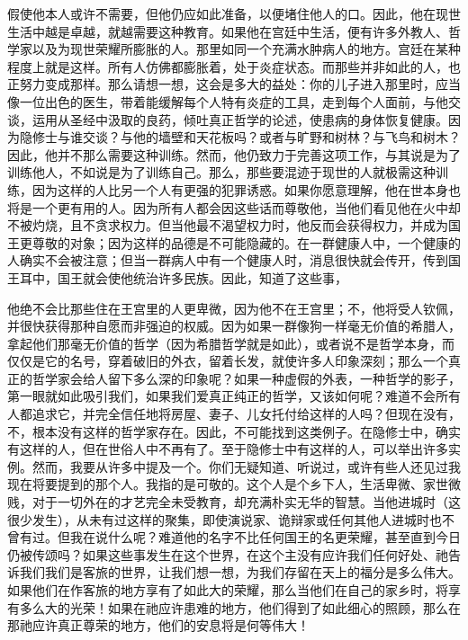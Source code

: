 假使他本人或许不需要，但他仍应如此准备，以便堵住他人的口。因此，他在现世生活中越是卓越，就越需要这种教育。如果他在宫廷中生活，便有许多外教人、哲学家以及为现世荣耀所膨胀的人。那里如同一个充满水肿病人的地方。宫廷在某种程度上就是这样。所有人仿佛都膨胀着，处于炎症状态。而那些并非如此的人，也正努力变成那样。那么请想一想，这会是多大的益处：你的儿子进入那里时，应当像一位出色的医生，带着能缓解每个人特有炎症的工具，走到每个人面前，与他交谈，运用从圣经中汲取的良药，倾吐真正哲学的论述，使患病的身体恢复健康。因为隐修士与谁交谈？与他的墙壁和天花板吗？或者与旷野和树林？与飞鸟和树木？因此，他并不那么需要这种训练。然而，他仍致力于完善这项工作，与其说是为了训练他人，不如说是为了训练自己。那么，那些要混迹于现世的人就极需这种训练，因为这样的人比另一个人有更强的犯罪诱惑。如果你愿意理解，他在世本身也将是一个更有用的人。因为所有人都会因这些话而尊敬他，当他们看见他在火中却不被灼烧，且不贪求权力。但当他最不渴望权力时，他反而会获得权力，并成为国王更尊敬的对象；因为这样的品德是不可能隐藏的。在一群健康人中，一个健康的人确实不会被注意；但当一群病人中有一个健康人时，消息很快就会传开，传到国王耳中，国王就会使他统治许多民族。因此，知道了这些事，\par

他绝不会比那些住在王宫里的人更卑微，因为他不在王宫里；不，他将受人钦佩，并很快获得那种自愿而非强迫的权威。因为如果一群像狗一样毫无价值的希腊人，拿起他们那毫无价值的哲学（因为希腊哲学就是如此），或者说不是哲学本身，而仅仅是它的名号，穿着破旧的外衣，留着长发，就使许多人印象深刻；那么一个真正的哲学家会给人留下多么深的印象呢？如果一种虚假的外表，一种哲学的影子，第一眼就如此吸引我们，如果我们爱真正纯正的哲学，又该如何呢？难道不会所有人都追求它，并完全信任地将房屋、妻子、儿女托付给这样的人吗？但现在没有，不，根本没有这样的哲学家存在。因此，不可能找到这类例子。在隐修士中，确实有这样的人，但在世俗人中不再有了。至于隐修士中有这样的人，可以举出许多实例。然而，我要从许多中提及一个。你们无疑知道、听说过，或许有些人还见过我现在将要提到的那个人。我指的是可敬的。这个人是个乡下人，生活卑微、家世微贱，对于一切外在的才艺完全未受教育，却充满朴实无华的智慧。当他进城时（这很少发生），从未有过这样的聚集，即使演说家、诡辩家或任何其他人进城时也不曾有过。但我在说什么呢？难道他的名字不比任何国王的名更荣耀，甚至直到今日仍被传颂吗？如果这些事发生在这个世界，在这个主没有应许我们任何好处、祂告诉我们我们是客旅的世界，让我们想一想，为我们存留在天上的福分是多么伟大。如果他们在作客旅的地方享有了如此大的荣耀，那么当他们在自己的家乡时，将享有多么大的光荣！如果在祂应许患难的地方，他们得到了如此细心的照顾，那么在那祂应许真正尊荣的地方，他们的安息将是何等伟大！\par

